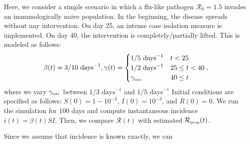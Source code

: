 \documentclass[12pt]{article}
\newcommand{\Rx}[1]{\ensuremath{{\mathcal R}_{#1}}\xspace}
\newcommand{\Ro}{\Rx{0}}
\newcommand{\RR}{\ensuremath{{\mathcal R}}\xspace}
\newcommand{\tsub}[2]{#1_{{\textrm{\tiny #2}}}}
\begin{document}
Here, we consider a simple scenario in which a flu-like pathogen $\Ro = 1.5$ invades an immunologically naive population.
In the beginning, the disease spreads without any intervention.
On day 25, an intense case isolation measure is implemented. 
On day 40, the intervention is completely/partially lifted.
This is modeled as follows:
\begin{equation}
\beta(t) = 3/10\,\,\textrm{days}^{-1}, \gamma(t) = \begin{cases}
1/5\,\, \textrm{days}^{-1} & t < 25\\
1/2\,\, \textrm{days}^{-1} & 25 \leq t < 40 \\
\tsub{\gamma}{late} & 40 \leq t
\end{cases},
\end{equation}
where we vary $\tsub{\gamma}{late}$ between $1/3\,\, \textrm{days}^{-1}$ and $1/5\,\, \textrm{days}^{-1}$
Initial conditions are specified as follows: $S(0) = 1 - 10^{-3}$, $I(0) = 10^{-3}$, and $R(0) = 0$.
We run the simulation for 100 days and compute instantaneous incidence $i(t) = \beta(t) S I$. 
Then, we compare $\RR(t)$ with estimated $\tsub{\RR}{prop}(t)$.

Since we assume that incidence is known exactly, we can 
\end{document}
